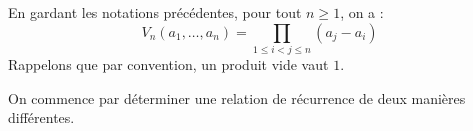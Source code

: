 \documentclass[french,11pt,twoside]{VcCours}
\begin{document}
\begin{Proposition}{} En gardant les notations précédentes, pour tout $n \geq 1$, on a :
$$ V_n(a_1, \ldots, a_n) = \prod_{1 \leq i<j \leq n} (a_j-a_i) $$
Rappelons que par convention, un produit vide vaut $1$.
\end{Proposition}

\begin{Demonstration}{} On commence par déterminer une relation de récurrence de deux manières différentes. 

%

\end{Demonstration}
\end{document}
